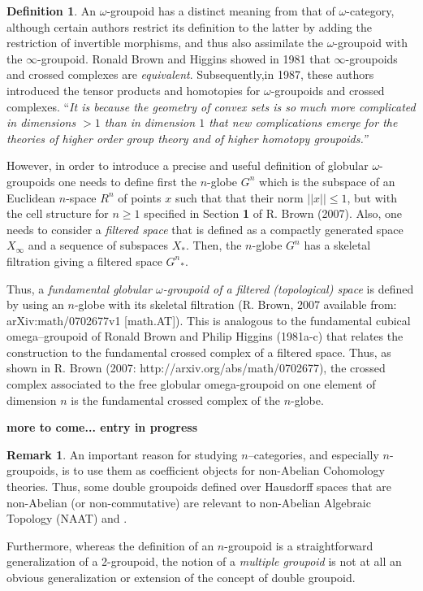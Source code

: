 \documentclass[12pt]{article}
\theoremstyle{plain}
\theoremstyle{definition}
\newtheorem{definition}{Definition}[section]
\newtheorem{remark}{Remark}[section]
\numberwithin{equation}{section}
\newcommand{\<}{{\langle}}
\begin{document}
\begin{definition}
An $\omega$-groupoid has a distinct meaning from that of $\omega$-category, although certain authors restrict its definition to the latter by adding the restriction of invertible morphisms, and thus also assimilate the $\omega$-groupoid with the $\infty$-groupoid.  Ronald Brown and Higgins showed in 1981 that $\infty$-groupoids and crossed complexes are {\em equivalent}. Subsequently,in 1987, these authors introduced the tensor products and homotopies for $\omega$-groupoids and crossed complexes. ``{\em It is because the geometry of convex sets is so much more complicated in dimensions $>1$ than in dimension $1$ that new complications emerge for the theories of higher order group theory and of higher homotopy groupoids.''}

However, in order to introduce a precise and useful definition of globular $\omega$-groupoids one needs to define first the $n$-globe $G^n$ which is the subspace of an Euclidean $n$-space $R^n$ of points $x$ such that that their norm 
$||x|| \leq 1$, but with the cell structure for $n \geq 1$ specified in Section {\bf 1} of R. Brown (2007). Also, one needs to consider a {\em filtered space} that is defined as a compactly generated space $X_{\infty}$ and a sequence of subspaces $X_*$. Then, the $n$-globe $G^n$ has a skeletal filtration giving a filtered space ${G^n}_*$.

Thus, a {\em fundamental globular {\em $\omega$-groupoid} of a filtered (topological) space} is defined by using an $n$-globe with its skeletal filtration (R. Brown, 2007 available from: arXiv:math/0702677v1 [math.AT]). This is analogous to the fundamental cubical omega--groupoid of Ronald Brown and Philip Higgins (1981a-c) that relates the construction to the fundamental crossed complex of a filtered space. Thus, as shown in R. Brown (2007: http://arxiv.org/abs/math/0702677), the crossed complex associated to the free globular omega-groupoid on one element of dimension $n$ is the fundamental crossed complex of the $n$-globe.

{\bf more to come... entry in progress}
\end{definition}

\begin{remark}

 An important reason for studying $n$--categories, and especially 
$n$-groupoids, is to use them as coefficient objects for non-Abelian Cohomology theories. Thus, some double groupoids defined over Hausdorff spaces that are non-Abelian (or non-commutative) are relevant to non-Abelian Algebraic Topology (NAAT) and .

 Furthermore, whereas the definition of an $n$-groupoid is a straightforward generalization of a 2-groupoid, the notion of a \emph{multiple groupoid} is not at all an obvious generalization or extension of the concept of double groupoid. 
\end{remark}
\end{document}
